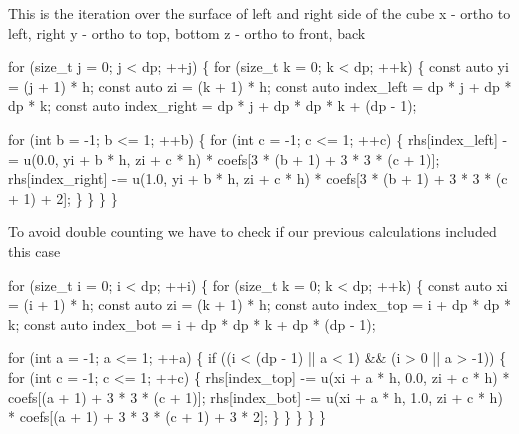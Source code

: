 This is the iteration over the surface of left and right side of the cube x -\/ ortho to left, right y -\/ ortho to top, bottom z -\/ ortho to front, back


\begin{DoxyCode}
\textcolor{keywordflow}{for} (\textcolor{keywordtype}{size\_t} j = 0; j < dp; ++j) \{
    \textcolor{keywordflow}{for} (\textcolor{keywordtype}{size\_t} k = 0; k < dp; ++k) \{
        \textcolor{keyword}{const} \textcolor{keyword}{auto} yi = (j + 1) * h;
        \textcolor{keyword}{const} \textcolor{keyword}{auto} zi = (k + 1) * h;
        \textcolor{keyword}{const} \textcolor{keyword}{auto} index\_left = dp * j + dp * dp * k;
        \textcolor{keyword}{const} \textcolor{keyword}{auto} index\_right = dp * j + dp * dp * k + (dp - 1);

        \textcolor{keywordflow}{for} (\textcolor{keywordtype}{int} b = -1; b <= 1; ++b) \{
            \textcolor{keywordflow}{for} (\textcolor{keywordtype}{int} c = -1; c <= 1; ++c) \{
                rhs[index\_left] -= u(0.0, yi + b * h, zi + c * h) *
                                   coefs[3 * (b + 1) + 3 * 3 * (c + 1)];
                rhs[index\_right] -=
                    u(1.0, yi + b * h, zi + c * h) *
                    coefs[3 * (b + 1) + 3 * 3 * (c + 1) + 2];
            \}
        \}
    \}
\}
\end{DoxyCode}


To avoid double counting we have to check if our previous calculations included this case


\begin{DoxyCode}
\textcolor{keywordflow}{for} (\textcolor{keywordtype}{size\_t} i = 0; i < dp; ++i) \{
    \textcolor{keywordflow}{for} (\textcolor{keywordtype}{size\_t} k = 0; k < dp; ++k) \{
        \textcolor{keyword}{const} \textcolor{keyword}{auto} xi = (i + 1) * h;
        \textcolor{keyword}{const} \textcolor{keyword}{auto} zi = (k + 1) * h;
        \textcolor{keyword}{const} \textcolor{keyword}{auto} index\_top = i + dp * dp * k;
        \textcolor{keyword}{const} \textcolor{keyword}{auto} index\_bot = i + dp * dp * k + dp * (dp - 1);

        \textcolor{keywordflow}{for} (\textcolor{keywordtype}{int} a = -1; a <= 1; ++a) \{
            \textcolor{keywordflow}{if} ((i < (dp - 1) || a < 1) && (i > 0 || a > -1)) \{
                \textcolor{keywordflow}{for} (\textcolor{keywordtype}{int} c = -1; c <= 1; ++c) \{
                    rhs[index\_top] -= u(xi + a * h, 0.0, zi + c * h) *
                                      coefs[(a + 1) + 3 * 3 * (c + 1)];
                    rhs[index\_bot] -=
                        u(xi + a * h, 1.0, zi + c * h) *
                        coefs[(a + 1) + 3 * 3 * (c + 1) + 3 * 2];
                \}
            \}
        \}
    \}
\}
\end{DoxyCode}


